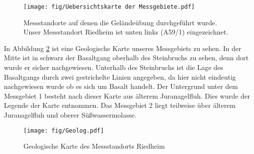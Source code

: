 \begin{figure}[h]
 \centering
 \texttt{[image: fig/Uebersichtskarte der Messgebiete.pdf]}
 \caption[Messgebiete]{Messstandorte auf denen die Geländeübung durchgeführt wurde. Unser Messstandort Riedheim ist unten links (A59/1) eingezeichnet.}
 \label{abb:Messgebiete}
\end{figure}


In Abbildung \ref{abb:Geolog} ist eine Geologische Karte unseres Messgebiets zu sehen. In der Mitte ist in schwarz der Basaltgang oberhalb des Steinbruchs zu sehen, denn dort wurde er sicher nachgewiesen.
Unterhalb des Steinbruchs ist die Lage des Basaltgangs durch zwei gestrichelte Linien angegeben, da hier nicht eindeutig nachgewiesen wurde ob es sich um Basalt handelt. Der Untergrund unter dem Messgebiet 1 besteht nach dieser Karte aus älterem Juranagelfluh. Dies wurde der Legende der Karte entnommen. Das Messgebiet 2 liegt teilweise über älterem Juranagelfluh und oberer Süßwassermolasse.

\begin{figure}
 \centering
 \texttt{[image: fig/Geolog.pdf]}
 \caption[Geologische Karte]{Geologische Karte des Messstandorts Riedheim}
 \label{abb:Geolog}
\end{figure}



